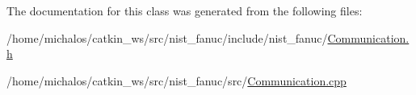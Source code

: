 The documentation for this class was generated from the following files\-:\begin{DoxyCompactItemize}
\item 
/home/michalos/catkin\-\_\-ws/src/nist\-\_\-fanuc/include/nist\-\_\-fanuc/\hyperlink{Communication_8h}{Communication.\-h}\item 
/home/michalos/catkin\-\_\-ws/src/nist\-\_\-fanuc/src/\hyperlink{Communication_8cpp}{Communication.\-cpp}\end{DoxyCompactItemize}
